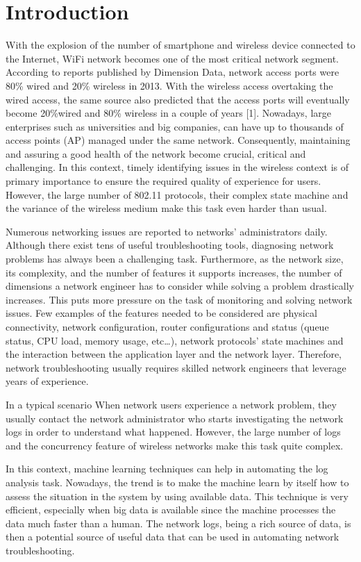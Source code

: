 \documentclass[conference]{IEEEtran}
\begin{document}
\section{Introduction}
With the explosion of the number of smartphone and wireless device connected to the Internet, WiFi network becomes one of the most critical network segment. According to reports published by Dimension Data, network access ports were 80\% wired and 20\% wireless in 2013. With the wireless access overtaking the wired access, the same source also predicted that the access ports will eventually become 20\%wired and 80\% wireless in a couple of years [1]. Nowadays, large enterprises such as universities and big companies, can have up to thousands of access points (AP) managed under the same network. Consequently, maintaining and assuring a good health of the network become crucial, critical and challenging. In this context, timely identifying issues in the wireless context is of primary importance to ensure the required quality of experience for users. However, the large number of 802.11 protocols, their complex state machine and the variance of the wireless medium make this task even harder than usual. 

Numerous networking issues are reported to networks’ administrators daily. Although there exist tens of useful troubleshooting tools, diagnosing network problems has always been a challenging task. Furthermore, as the network size, its complexity, and the number of features it supports increases, the number of dimensions a network engineer has to consider while solving a problem drastically increases. This puts more pressure on the task of monitoring and solving network issues. Few examples of the features needed to be considered are physical connectivity, network configuration, router configurations and status (queue status, CPU load, memory usage, etc…), network protocols’ state machines and the interaction between the application layer and the network layer. Therefore, network troubleshooting usually requires skilled network engineers that leverage years of experience.

In a typical scenario When network users experience a network problem, they usually contact the network administrator who starts investigating the network logs in order to understand what happened. However, the large number of logs and the concurrency feature of wireless networks make this task quite complex.

In this context, machine learning techniques can help in automating the log analysis task. Nowadays, the trend is to make the machine learn by itself how to assess the situation in the system by using available data. This technique is very efficient, especially when big data is available since the machine processes the data much faster than a human. The network logs, being a rich source of data, is then a potential source of useful data that can be used in automating network troubleshooting.
\end{document}
